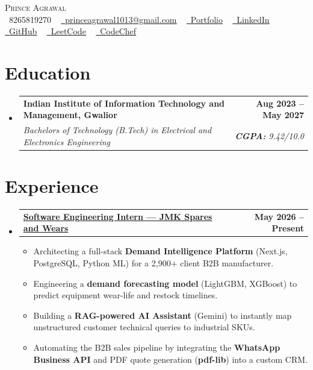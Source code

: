 \documentclass[letterpaper,11pt]{article}
\makeatletter
\newcommand{\resumeItem}[1]{\item\small{{#1 \vspace{-2pt}}}}
\newcommand{\resumeSubheading}[4]{
  \vspace{-2pt}\item
    \begin{tabular*}{1.0\textwidth}[t]{l@{\extracolsep{\fill}}r}
      \textbf{#1} & \textbf{\small #2} \\
      \textit{\small#3} & \textit{\small #4} \\
    \end{tabular*}\vspace{-7pt}
}
\newcommand{\resumeSingleSubheading}[2]{
  \vspace{-2pt}\item
    \begin{tabular*}{1.0\textwidth}[t]{l@{\extracolsep{\fill}}r}
      \textbf{#1} & \textbf{\small #2} \\
    \end{tabular*}\vspace{-7pt}
}
\newcommand{\resumeSubHeadingListStart}{\begin{itemize}[leftmargin=0.0in, label={}]}
\newcommand{\resumeSubHeadingListEnd}{\end{itemize}}
\newcommand{\resumeItemListStart}{\begin{itemize}}
\newcommand{\resumeItemListEnd}{\end{itemize}}
\makeatother
\begin{document}
\begin{center}
    {\Huge \scshape Prince Agrawal} \\ \vspace{1pt}
    \small
    \raisebox{-0.1\height}\faPhone\ 8265819270 ~
    \href{mailto:princeagrawal1013@gmail.com}{\raisebox{-0.2\height}\faEnvelope\ \underline{princeagrawal1013@gmail.com}} ~
    \href{https://prince-agrawal.vercel.app/}{\raisebox{-0.2\height}\faGlobe\ \underline{Portfolio}} ~
    \href{https://linkedin.com/in/prince-agrawal-}{\raisebox{-0.2\height}\faLinkedin\ \underline{LinkedIn}} ~
    \href{https://github.com/Princeag1310}{\raisebox{-0.2\height}\faGithub\ \underline{GitHub}}
    ~
\href{https://leetcode.com/u/princeagrawal1013/}{\raisebox{-0.2\height}\faCode\ \underline{LeetCode}} ~
\href{https://www.codechef.com/users/prince_agrawal}{\raisebox{-0.2\height}\faCode\ \underline{CodeChef}}
\end{center}


\section{Education}
\resumeSubHeadingListStart
  \resumeSubheading
    {Indian Institute of Information Technology and Management, Gwalior}{Aug 2023 -- May 2027}
    {Bachelors of Technology (B.Tech) in Electrical and Electronics Engineering}{\textbf{CGPA:} 9.42/10.0}
\resumeSubHeadingListEnd


\section{Experience}
\resumeSubHeadingListStart
  \resumeSingleSubheading
    {\href{https://drive.google.com/file/d/1i3JLR0eSk9Z6Ik90J1tO0S2d-GYZ0QIP/view?usp=sharing}{\textcolor{customgreen}{Software Engineering Intern --- JMK Spares and Wears}}}{May 2026 -- Present}
    \resumeItemListStart
      \resumeItem{Architecting a full-stack \textbf{Demand Intelligence Platform} (Next.js, PostgreSQL, Python ML) for a 2,900+ client B2B manufacturer.}
      \resumeItem{Engineering a \textbf{demand forecasting model} (LightGBM, XGBoost) to predict equipment wear-life and restock timelines.}
      \resumeItem{Building a \textbf{RAG-powered AI Assistant} (Gemini) to instantly map unstructured customer technical queries to industrial SKUs.}
      \resumeItem{Automating the B2B sales pipeline by integrating the \textbf{WhatsApp Business API} and PDF quote generation (\textbf{pdf-lib}) into a custom CRM.}
    \resumeItemListEnd
\resumeSubHeadingListEnd
\end{document}
